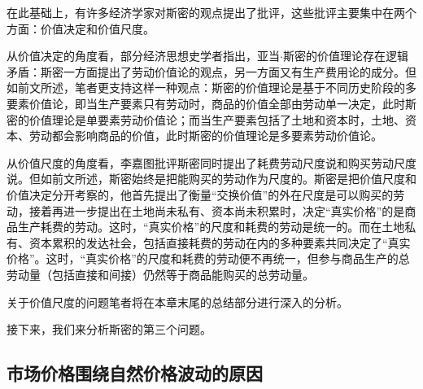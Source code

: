 在此基础上，有许多经济学家对斯密的观点提出了批评，这些批评主要集中在两个方面：价值决定和价值尺度。

从价值决定的角度看，部分经济思想史学者指出，亚当$\cdot$斯密的价值理论存在逻辑矛盾：斯密一方面提出了劳动价值论的观点，另一方面又有生产费用论的成分\cite[136]{CaiJiMingCongGuDianZhengZhiJingJiXueDaoZhongGuoTeSeSheHuiZhuYiZhengZhiJingJiXueJiYuZhongGuoShiJiaoDeZhengZhiJingJiXueYanBianShangCe2023}\cite[294]{YueSeFu*XiongBiTeJingJiFenXiShiDi1Juan2017}\cite[47]{ZhongGongZhongYangMaKeSiEnGeSiLieNingSiDaLinZhuZuoBianYiJuMaKeSiEnGeSiQuanJiDi26JuanDi1Ce1972}。但如前文所述，笔者更支持这样一种观点：斯密的价值理论是基于不同历史阶段的多要素价值论\cite[136]{CaiJiMingCongGuDianZhengZhiJingJiXueDaoZhongGuoTeSeSheHuiZhuYiZhengZhiJingJiXueJiYuZhongGuoShiJiaoDeZhengZhiJingJiXueYanBianShangCe2023}，即当生产要素只有劳动时，商品的价值全部由劳动单一决定，此时斯密的价值理论是单要素劳动价值论；而当生产要素包括了土地和资本时，土地、资本、劳动都会影响商品的价值，此时斯密的价值理论是多要素劳动价值论\cite{peachAdamSmithsLabor2020}\cite[21]{MaKe*BuLaoGeJingJiLiLunDeHuiGu2018}\cite[70-71]{meekStudiesLaborTheory1973}。

从价值尺度的角度看，李嘉图批评斯密同时提出了耗费劳动尺度说和购买劳动尺度说\cite[7]{DaWei*LiJiaTuZhengZhiJingJiXueJiFuShuiYuanLi2021}。但如前文所述，斯密始终是把能购买的劳动作为尺度的\cite[142]{CaiJiMingCongGuDianZhengZhiJingJiXueDaoZhongGuoTeSeSheHuiZhuYiZhengZhiJingJiXueJiYuZhongGuoShiJiaoDeZhengZhiJingJiXueYanBianShangCe2023}\cite[63]{meekStudiesLaborTheory1973}。斯密是把价值尺度和价值决定分开考察的\cite[73]{ChenDaiSunCongGuDianJingJiXuePaiDaoMaKeSiRuoGanZhuYaoXueShuoFaZhanLueLun2014}，他首先提出了衡量“交换价值”的外在尺度是可以购买的劳动\cite{rodriguezherreraAdamSmithsConcept2016}，接着再进一步提出在土地尚未私有、资本尚未积累时，决定“真实价格”的是商品生产耗费的劳动。这时，“真实价格”的尺度和耗费的劳动是统一的。而在土地私有、资本累积的发达社会，包括直接耗费的劳动在内的多种要素共同决定了“真实价格”。这时，“真实价格”的尺度和耗费的劳动便不再统一，但参与商品生产的总劳动量（包括直接和间接）仍然等于商品能购买的总劳动量。\cite[67-69]{CaiJiMingLunHaoFeiDeLaoDongYuGouMaiDeLaoDongZaiJieZhiLiLunZhongDeZuoYong2022}

关于价值尺度的问题笔者将在本章末尾的总结部分进行深入的分析。

接下来，我们来分析斯密的第三个问题。

\subsection{市场价格围绕自然价格波动的原因}

